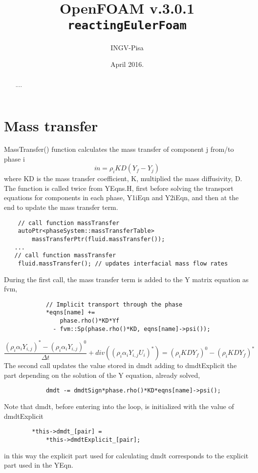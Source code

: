 \documentclass[a4paper, 12 pt, fleqn]{article}
\title{OpenFOAM\textsuperscript{\textregistered} v.3.0.1 \\ {\tt reactingEulerFoam}}
\author{INGV-Pisa}
\date{April 2016.}
\begin{document}
\maketitle 
\begin{abstract}
....
\end{abstract}

\section{Mass transfer}
MassTransfer() function calculates the mass transfer of component j from/to phase i 
\begin{equation}
\dot{m} = \rho_i KD \left( Y_f - Y_j \right)
\end{equation}
where KD is the mass transfer coefficient, K, multiplied the mass diffusivity, D.
The function is called twice from YEqns.H, first before solving the transport equations for components in each phase, Y1iEqn and Y2iEqn, and then at the end to update the mass transfer term.
\begin{lstlisting}
    // call function massTransfer 
    autoPtr<phaseSystem::massTransferTable>
        massTransferPtr(fluid.massTransfer());  
   ...
   // call function massTransfer 
    fluid.massTransfer(); // updates interfacial mass flow rates
\end{lstlisting}  
During the first call, the mass transfer term is added to the Y matrix equation as fvm, 
\begin{lstlisting} 
            // Implicit transport through the phase
            *eqns[name] +=
                phase.rho()*KD*Yf
              - fvm::Sp(phase.rho()*KD, eqns[name]->psi());
\end{lstlisting}  
\begin{equation}
\frac{ (\rho_i \alpha_i Y_{i,j})^* - (\rho_i \alpha_i Y_{i,j})^0} {\Delta t} + div\left( (\rho_i \alpha_i Y_{i,j}U_i )^* \right) = (\rho_i KD Y_f)^0 - (\rho_i KD Y_f)^*
\end{equation}             
The second call updates the value stored in dmdt adding to dmdtExplicit the part depending on the solution of the Y equation, already solved,
\begin{lstlisting}
            dmdt -= dmdtSign*phase.rho()*KD*eqns[name]->psi();
\end{lstlisting}            
Note that dmdt, before entering into the loop, is initialized with the value of dmdtExplicit 
\begin{lstlisting}
        *this->dmdt_[pair] =
            *this->dmdtExplicit_[pair];
\end{lstlisting}
in this way the explicit part used for calculating dmdt corresponds to the explicit part used in the YEqn.  
\end{document}
